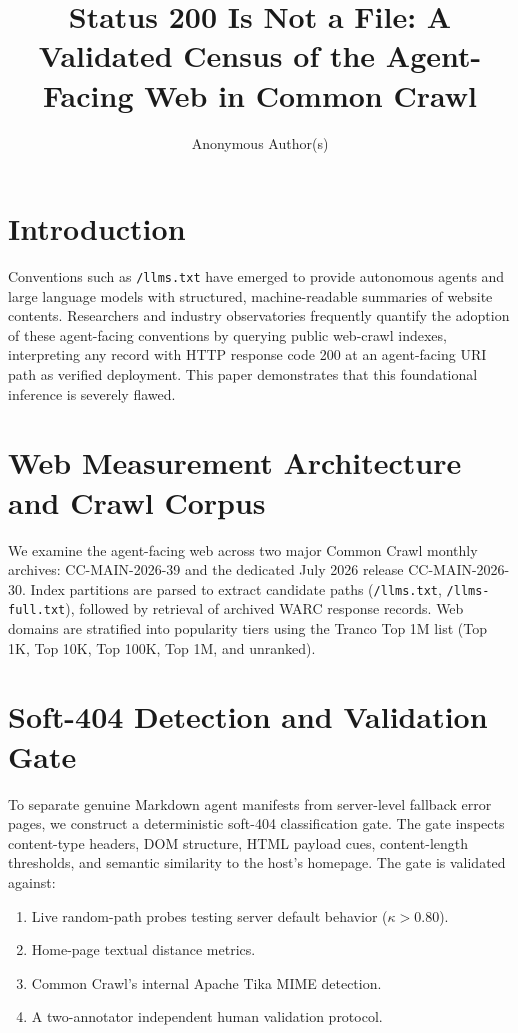 \documentclass[sigconf,anonymous,review]{acmart}
\title{Status 200 Is Not a File: A Validated Census of the Agent-Facing Web in Common Crawl}
\author{Anonymous Author(s)}
\affiliation{%
  \institution{Anonymous Institution}
  \country{Anonymous Country}
}
\begin{document}
\maketitle

\section{Introduction}
Conventions such as \texttt{/llms.txt} have emerged to provide autonomous agents and large language models with structured, machine-readable summaries of website contents. Researchers and industry observatories frequently quantify the adoption of these agent-facing conventions by querying public web-crawl indexes, interpreting any record with HTTP response code 200 at an agent-facing URI path as verified deployment. This paper demonstrates that this foundational inference is severely flawed.

\section{Web Measurement Architecture and Crawl Corpus}
We examine the agent-facing web across two major Common Crawl monthly archives: CC-MAIN-2026-39 and the dedicated July 2026 release CC-MAIN-2026-30. Index partitions are parsed to extract candidate paths (\texttt{/llms.txt}, \texttt{/llms-full.txt}), followed by retrieval of archived WARC response records. Web domains are stratified into popularity tiers using the Tranco Top 1M list (Top 1K, Top 10K, Top 100K, Top 1M, and unranked).

\section{Soft-404 Detection and Validation Gate}
To separate genuine Markdown agent manifests from server-level fallback error pages, we construct a deterministic soft-404 classification gate. The gate inspects content-type headers, DOM structure, HTML payload cues, content-length thresholds, and semantic similarity to the host's homepage. The gate is validated against:
\begin{enumerate}
    \item Live random-path probes testing server default behavior ($\kappa > 0.80$).
    \item Home-page textual distance metrics.
    \item Common Crawl's internal Apache Tika MIME detection.
    \item A two-annotator independent human validation protocol.
\end{enumerate}
\end{document}
